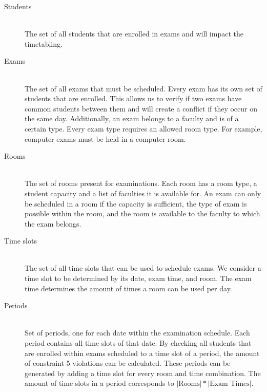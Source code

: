 \begin{description}
   \item [Students] \hfill \\ The set of all students that are enrolled in exams and will impact the timetabling.
   \item[Exams] \hfill \\ The set of all exams that must be scheduled. Every exam has its own set of students that are enrolled. This allows us to verify if two exams have common students between them and will create a conflict if they occur on the same day. Additionally, an exam belongs to a faculty and is of a certain type. Every exam type requires an allowed room type. For example, computer exams must be held in a computer room.
   \item[Rooms] \hfill \\The set of rooms present for examinations. Each room has a room type, a student capacity and a list of faculties it is available for. An exam can only be scheduled in a room if the capacity is sufficient, the type of exam is possible within the room, and the room is available to the faculty to which the exam belongs.
    \item[Time slots] \hfill \\ The set of all time slots that can be used to schedule exams. We consider a time slot to be determined by its date, exam time, and room. The exam time determines the amount of times a room can be used per day.
    \item[Periods] \hfill \\ Set of periods, one for each date within the examination schedule. Each period contains all time slots of that date. By checking all students that are enrolled within exams scheduled to a time slot of a period, the amount of constraint 5 violations can be calculated. These periods can be generated by adding a time slot for every room and time combination. The amount of time slots in a period corresponds to $|\text{Rooms}| * |\text{Exam Times}|$.
\end{description}
